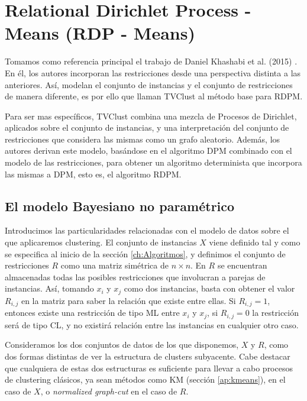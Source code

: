 \clearpage




\section{Relational Dirichlet Process - Means (RDP - Means)} \label{rdpmYtvc}

Tomamos como referencia principal el trabajo de Daniel Khashabi et al. (2015) \cite{RDPM:2015}. En él, los autores incorporan las restricciones desde una perspectiva distinta a las anteriores. Así, modelan el conjunto de instancias y el conjunto de restricciones de manera diferente, es por ello que llaman \acf{TVClust} al método base para \acf{RDPM}.

Para ser mas específicos, \acs{TVClust} combina una mezcla de Procesos de Dirichlet, aplicados sobre el conjunto de instancias, y una interpretación del conjunto de restricciones que considera las mismas como un grafo aleatorio. Además, los autores derivan este modelo, basándose en el algoritmo \acf{DPM} \cite{DPM:2012} combinado con el modelo de las restricciones, para obtener un algoritmo determinista que incorpora las mismas a \acs{DPM}, esto es, el algoritmo \acf{RDPM}.

\subsection{El modelo Bayesiano no paramétrico}

Introducimos las particularidades relacionadas con el modelo de datos sobre el que aplicaremos clustering. El conjunto de instancias $X$ viene definido tal y como se especifica al inicio de la sección \ref{ch:Algoritmos}, y definimos el conjunto de restricciones $R$ como una matriz simétrica de $n \times n$. En $R$ se encuentran almacenadas todas las posibles restricciones que involucran a parejas de instancias. Así, tomando $x_i$ y $x_j$ como dos instancias, basta con obtener el valor $R_{i,j}$ en la matriz para saber la relación que existe entre ellas. Si $R_{i,j} = 1$, entonces existe una restricción de tipo \acf{ML} entre $x_i$ y $x_j$, si $R_{i,j} = 0$ la restricción será de tipo \acf{CL}, y no existirá relación entre las instancias en cualquier otro caso.

Consideramos los dos conjuntos de datos de los que disponemos, $X$ y $R$, como dos formas distintas de ver la estructura de clusters subyacente. Cabe destacar que cualquiera de estas dos estructuras es suficiente para llevar a cabo procesos de clustering clásicos, ya sean métodos como \acf{KM} (sección \ref{ap:kmeans}), en el caso de $X$, o \textit{normalized graph-cut} en el caso de $R$.

